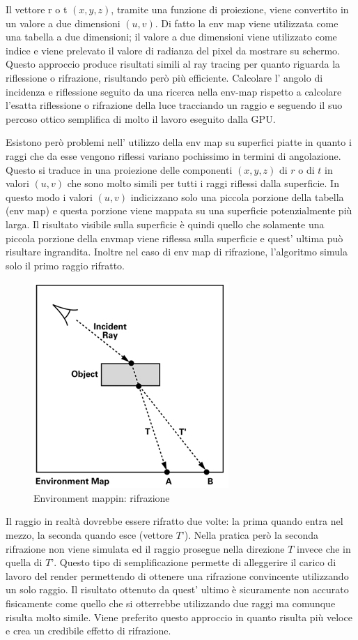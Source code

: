 Il vettore r o t $(x,y,z)$, tramite una funzione di proiezione, viene convertito in un valore a due dimensioni $(u,v)$. Di fatto la env map viene utilizzata come una tabella a due dimensioni; il valore a due dimensioni viene utilizzato come indice e viene prelevato il valore di radianza del pixel da mostrare su schermo.
\\
Questo approccio produce risultati simili al ray tracing per quanto riguarda la riflessione o rifrazione, risultando però  più efficiente. 
Calcolare l’ angolo di incidenza e riflessione seguito da una ricerca nella env-map rispetto a calcolare l’esatta riflessione o rifrazione della luce tracciando un raggio e seguendo il suo percoso ottico semplifica di molto il lavoro eseguito dalla GPU. 

Esistono però problemi nell’ utilizzo della env map su superfici piatte in quanto i raggi che da esse vengono riflessi variano pochissimo in termini di angolazione. Questo si traduce in una proiezione delle componenti $(x,y,z)$ di $r$ o di $t$ in valori $(u,v)$ che sono molto simili per tutti i raggi riflessi dalla superficie. In questo modo i valori $(u,v)$ indicizzano solo una piccola porzione della tabella (env map) e questa porzione viene mappata su una superficie potenzialmente più larga. Il risultato visibile sulla superficie è quindi quello che solamente una piccola porzione della envmap viene riflessa sulla superficie e quest’ ultima può risultare ingrandita.
Inoltre nel caso di env map di rifrazione, l’algoritmo simula solo il primo raggio rifratto.
\\
\begin{figure}[htb]
\centering
\includegraphics[width=0.5\linewidth]{images/chapter_stato_arte/stato_arte_refr_2.png}\hfill
\caption[Environment mapping: rifrazione]{Environment mappin: rifrazione}
\label{fig:stato_arte_refr_2}
\end{figure}
\newpage
Il raggio in realtà dovrebbe essere rifratto due volte: la prima quando entra nel mezzo, la seconda quando esce (vettore $T’$). Nella pratica però la seconda rifrazione non viene simulata ed il raggio prosegue nella direzione $T$ invece che in quella di $T’$. 
Questo tipo di semplificazione permette di alleggerire il carico di lavoro del render permettendo di ottenere una rifrazione convincente utilizzando un solo raggio.
Il risultato ottenuto da quest’ ultimo è sicuramente non accurato fisicamente come quello che si otterrebbe utilizzando due raggi ma comunque risulta molto simile.
Viene preferito questo approccio in quanto risulta più veloce e crea un credibile effetto di rifrazione.

